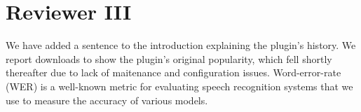 \documentclass[journal,12pt,onecolumn,draftclsnofoot,]{IEEEtran}
\begin{document}
%
%
%
%
%
%
%


\section{Reviewer III}

%
%
%

We have added a sentence to the introduction explaining the plugin's history. We report downloads to show the plugin's original popularity, which fell shortly thereafter due to lack of maitenance and configuration issues. Word-error-rate (WER) is a well-known metric for evaluating speech recognition systems that we use to measure the accuracy of various models.
\end{document}
